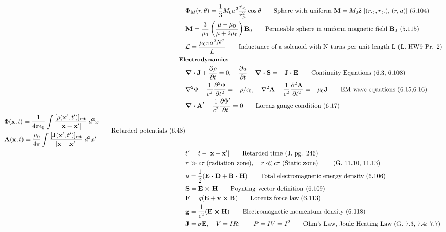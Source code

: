 \documentclass[10pt]{article}
\newcommand{\zhat}{\boldsymbol{\hat{\textbf{z}}}}
\newcommand{\ve}[1]{\boldsymbol{\mathbf{#1}}}
\newcommand{\vect}[1]{\boldsymbol{\mathbf{#1}}}
\newcommand{\eo}{\epsilon_0}
\newcommand{\pder}[2]{\frac{\partial #1}{\partial #2}}
\newcommand{\dpder}[2]{\frac{\partial^2 #1}{\partial #2^2}}
\newcommand{\K}{\frac{1}{4 \pi \eo}}
\begin{document}
\begin{multicols}{2}
\begin{align*}
		& \Phi_M(r,\theta) = \frac{1}{3} M_0 a^2 \frac{r_<}{r_>^2} \cos \theta \tag*{Sphere with uniform $\ve{M} = M_0 \zhat$ [$(r_<,r_>)$, $(r,a)$] (5.104)} \\
		& \vect{M} = \frac{3}{\mu_0} \left( \frac{\mu - \mu_0}{\mu + 2 \mu_0} \right) \vect{B}_0 \tag*{Permeable sphere in uniform magnetic field $\ve{B}_0$ (5.115)} \\
		& \mathcal{L} = \frac{\mu_0 \pi a^2 N^2}{L} \tag*{Inductance of a solenoid with N turns per unit length L (L. HW9 Pr. 2)} \\	
	& \small \hspace{-10pt} \textbf{Electrodynamics} \small \\
		& \ve{\nabla \cdot J} + \pder{\rho}{t} = 0, \quad \pder{u}{t} + \ve{\nabla \cdot S} = - \ve{J \cdot E} \tag*{Continuity Equations (6.3, 6.108)} \\
		& \nabla^2 \Phi - \frac{1}{c^2} \dpder{\Phi}{t} = -\rho / \eo, \quad \nabla^2 \ve{A} - \frac{1}{c^2} \dpder{\ve{A}}{t} = -\mu_0 \ve{J} \tag*{EM wave equations (6.15,6.16)} \\
		& \ve{\nabla \cdot A}' + \frac{1}{c^2} \pder{\Phi'}{t} = 0 \tag*{Lorenz gauge condition (6.17)} \\
		\begin{split}
			& \Phi(\ve{x},t) = \K \int \frac{[\rho(\ve{x}',t')]_\text{ret}}{|\ve{x} - \ve{x}'|} \; d^3 x \\
			& \ve{A}(\ve{x},t) = \frac{\mu_0}{4 \pi} \int \frac{[\ve{J}(\ve{x}',t')]_\text{ret}}{|\ve{x} - \ve{x}'|} \; d^3 x' \\
		\end{split} \tag*{Retarded potentials (6.48)} \\
		& t' = t - |\ve{x} - \ve{x}'| \tag*{Retarded time (J. pg. 246)} \\
		& r \gg c \tau \; \text{(radiation zone)}, \quad r \ll c \tau \; \text{(Static zone)} \tag*{ (G. 11.10, 11.13)} \\
		& u = \frac{1}{2}(\ve{E \cdot D} + \ve{B \cdot H}) \tag*{Total electromagnetic energy density (6.106)} \\
		& \ve{S} = \ve{E \times H} \tag*{Poynting vector definition (6.109)} \\
		& \ve{F} = q(\ve{E} + \ve{v \times B}) \tag*{Lorentz force law (6.113)} \\
		& \ve{g} = \frac{1}{c^2} (\ve{E \times H}) \tag*{Electromagnetic momentum density (6.118)} \\
		& \ve{J} = \sigma \ve{E}, \quad V = IR; \qquad P = IV = I^2  \tag*{Ohm's Law, Joule Heating Law (G. 7.3, 7.4; 7.7)} \\

\end{align*}
\end{multicols}
\end{document}
